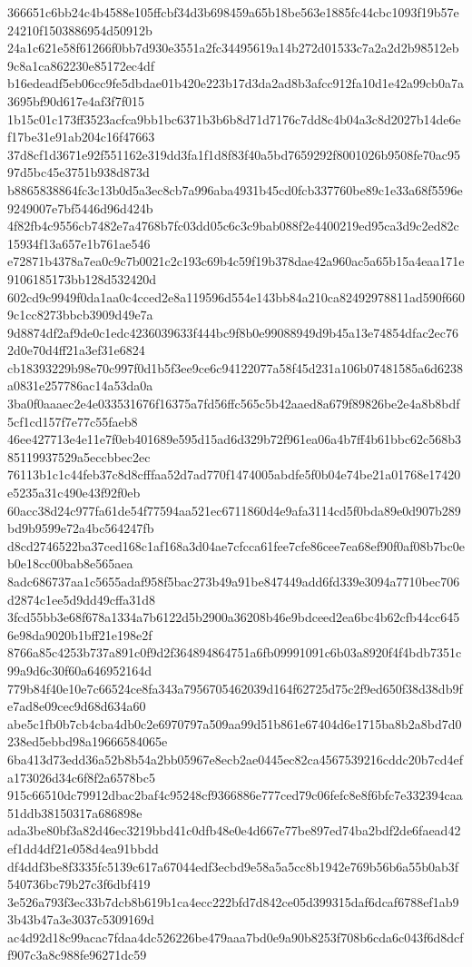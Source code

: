 {366651c6bb24c4b4588e105ffcbf34d3b698459a65b18be563e1885fc44cbc1093f19b57e24210f1503886954d50912b
24a1c621e58f61266f0bb7d930e3551a2fc34495619a14b272d01533c7a2a2d2b98512eb9c8a1ca862230e85172ec4df
b16edeadf5eb06cc9fe5dbdae01b420e223b17d3da2ad8b3afcc912fa10d1e42a99cb0a7a3695bf90d617e4af3f7f015
1b15c01c173ff3523acfca9bb1bc6371b3b6b8d71d7176c7dd8c4b04a3c8d2027b14de6ef17be31e91ab204c16f47663
37d8cf1d3671e92f551162e319dd3fa1f1d8f83f40a5bd7659292f8001026b9508fe70ac9597d5bc45e3751b938d873d
b8865838864fc3c13b0d5a3ec8cb7a996aba4931b45cd0fcb337760be89c1e33a68f5596e9249007e7bf5446d96d424b
4f82fb4c9556cb7482e7a4768b7fc03dd05c6c3c9bab088f2e4400219ed95ca3d9c2ed82c15934f13a657e1b761ae546
e72871b4378a7ea0c9c7b0021c2c193c69b4c59f19b378dae42a960ac5a65b15a4eaa171e9106185173bb128d532420d
602cd9c9949f0da1aa0c4cced2e8a119596d554e143bb84a210ca82492978811ad590f6609c1cc8273bbcb3909d49e7a
9d8874df2af9de0c1edc4236039633f444bc9f8b0e99088949d9b45a13e74854dfac2ec762d0e70d4ff21a3ef31e6824
cb18393229b98e70c997f0d1b5f3ee9ce6c94122077a58f45d231a106b07481585a6d6238a0831e257786ac14a53da0a
3ba0f0aaaec2e4e033531676f16375a7fd56ffc565c5b42aaed8a679f89826be2e4a8b8bdf5cf1cd157f7e77c55faeb8
46ee427713e4e11e7f0eb401689e595d15ad6d329b72f961ea06a4b7ff4b61bbc62c568b385119937529a5eccbbec2ec
76113b1c1c44feb37c8d8cfffaa52d7ad770f1474005abdfe5f0b04e74be21a01768e17420e5235a31c490e43f92f0eb
60acc38d24c977fa61de54f77594aa521ec6711860d4e9afa3114cd5f0bda89e0d907b289bd9b9599e72a4bc564247fb
d8cd2746522ba37ced168c1af168a3d04ae7cfcca61fee7cfe86cee7ea68ef90f0af08b7bc0eb0e18cc00bab8e565aea
8adc686737aa1c5655adaf958f5bac273b49a91be847449add6fd339e3094a7710bec706d2874c1ee5d9dd49cffa31d8
3fcd55bb3e68f678a1334a7b6122d5b2900a36208b46e9bdceed2ea6bc4b62cfb44cc6456e98da9020b1bff21e198e2f
8766a85c4253b737a891c0f9d2f364894864751a6fb09991091c6b03a8920f4f4bdb7351c99a9d6c30f60a646952164d
779b84f40e10e7c66524ce8fa343a7956705462039d164f62725d75c2f9ed650f38d38db9fe7ad8e09cec9d68d634a60
abe5c1fb0b7cb4cba4db0c2e6970797a509aa99d51b861e67404d6e1715ba8b2a8bd7d0238ed5ebbd98a19666584065e
6ba413d73edd36a52b8b54a2bb05967e8ecb2ae0445ec82ca4567539216cddc20b7cd4efa173026d34c6f8f2a6578bc5
915c66510dc79912dbac2baf4c95248cf9366886e777ced79c06fefc8e8f6bfc7e332394caa51ddb38150317a686898e
ada3be80bf3a82d46ec3219bbd41c0dfb48e0e4d667e77be897ed74ba2bdf2de6faead42ef1dd4df21e058d4ea91bbdd
df4ddf3be8f3335fc5139c617a67044edf3ecbd9e58a5a5cc8b1942e769b56b6a55b0ab3f540736bc79b27c3f6dbf419
3e526a793f3ec33b7dcb8b619b1ca4ecc222bfd7d842ce05d399315daf6dcaf6788ef1ab93b43b47a3e3037c5309169d
ac4d92d18c99acac7fdaa4dc526226be479aaa7bd0e9a90b8253f708b6cda6c043f6d8dcff907c3a8c988fe96271dc59
}
